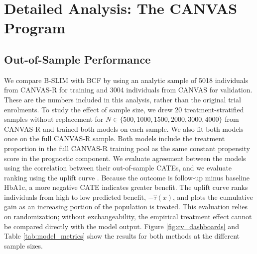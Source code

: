 \documentclass[12pt]{article}
\begin{document}
\begin{table}[htbp]
\centering\footnotesize
\caption{Coverage-matched individual CATE inference on IHDP. Each model's
intervals are rescaled towards a common empirical coverage target of $95\%$. The scale
factor is chosen from the other 99 data sets and then applied to the held-out
one; held-out coverage need not equal the target exactly. Values are mean (standard error) over 100 replicates. The scale factor
$c$ multiplies the distances from the posterior mean to the $2.5$th and $97.5$th posterior percentiles; $c>1$ widens the interval. ``Correct exclusion'' is the fraction
of children whose interval excludes zero in the direction of the true effect.}
\label{tab:ihdp_posterior_matched}
\end{table}

\section{Detailed Analysis: The CANVAS Program}
\label{SEC:supplement_canvas}

\subsection{Out-of-Sample Performance}
\label{subsec:oos_performance}

We compare B-SLIM with BCF by using an analytic sample of 5018 individuals from CANVAS-R for training and 3004 individuals from CANVAS for validation. These are the numbers included in this analysis, rather than the original trial enrolments. To study the effect of sample size, we drew 20 treatment-stratified samples without replacement for $N \in \{500, 1000, 1500, 2000, 3000, 4000\}$ from CANVAS-R and trained both models on each sample. We also fit both models once on the full CANVAS-R sample. Both models include the treatment proportion in the full CANVAS-R training pool as the same constant propensity score in the prognostic component. We evaluate agreement between the models using the correlation between their out-of-sample CATEs, and we evaluate ranking using the uplift curve \citep{rzepakowski2010decision}. Because the outcome is follow-up minus baseline HbA1c, a more negative CATE indicates greater benefit. The uplift curve ranks individuals from high to low predicted benefit, $-\hat\tau(x)$, and plots the cumulative gain as an increasing portion of the population is treated. This evaluation relies on randomization; without exchangeability, the empirical treatment effect cannot be compared directly with the model output. Figure \ref{fig:cv_dashboards} and Table \ref{tab:model_metrics} show the results for both methods at the different sample sizes.
\end{document}
